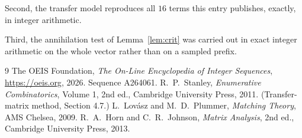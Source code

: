 \documentclass[11pt,a4paper]{article}
\theoremstyle{plain}
\theoremstyle{definition}
\begin{document}
Second, the transfer model reproduces all $16$ terms this entry publishes, exactly, in
integer arithmetic.

Third, the annihilation test of Lemma~\ref{lem:crit} was carried out in exact integer
arithmetic on the whole vector rather than on a sampled prefix.

\begin{thebibliography}{9}
 The OEIS Foundation, \emph{The On-Line Encyclopedia of Integer
Sequences}, \url{https://oeis.org}, 2026. Sequence A264061.
 R.~P.~Stanley, \emph{Enumerative Combinatorics}, Volume 1, 2nd ed.,
Cambridge University Press, 2011. (Transfer-matrix method, Section 4.7.)
 L.~Lov\'asz and M.~D.~Plummer, \emph{Matching Theory}, AMS Chelsea, 2009.
 R.~A.~Horn and C.~R.~Johnson, \emph{Matrix Analysis}, 2nd ed., Cambridge
University Press, 2013.
\end{thebibliography}
\end{document}
